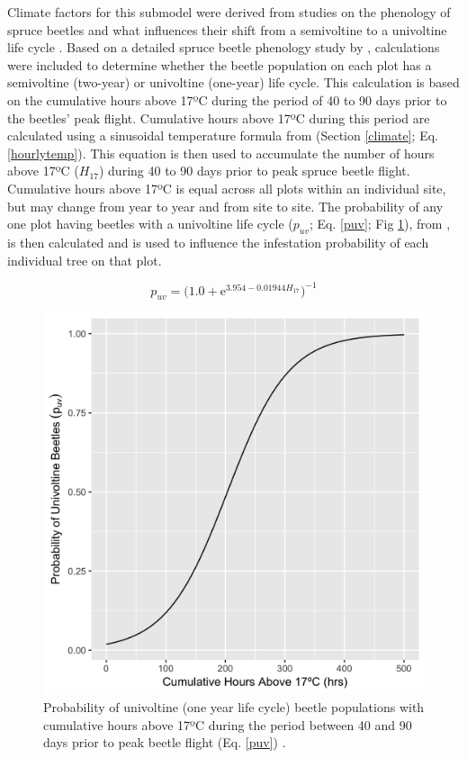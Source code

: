 \documentclass[a4paper, 12pt] {report}
\begin{document}
Climate factors for this submodel were derived from studies on the phenology of spruce beetles and what influences their shift from a semivoltine to a univoltine life cycle . Based on a detailed spruce beetle phenology study by , calculations were included to determine whether the beetle population on each plot has a semivoltine (two-year) or univoltine (one-year) life cycle. This calculation is based on the cumulative hours above 17ºC during the period of 40 to 90 days prior to the beetles’ peak flight. Cumulative hours above 17ºC during this period are calculated using a sinusoidal temperature formula from  (Section \ref{climate}; Eq. \ref{hourlytemp}). This equation is then used to accumulate the number of hours above 17ºC ($H_{17}$) during 40 to 90 days prior to peak spruce beetle flight. Cumulative hours above 17ºC is equal across all plots within an individual site, but may change from year to year and from site to site. The probability of any one plot having beetles with a univoltine life cycle ($p_{uv}$; Eq. \ref{puv}; Fig \ref{fig:fpuv}), from , is then calculated and is used to influence the infestation probability of each individual tree on that plot.

\begin{equation} \label{puv}
p_{uv} = \Big(1.0 + \text{e}^{3.954 - 0.01944H_{17}}\Big)^{-1}
\end{equation}

\begin{figure}
  \includegraphics[width=0.65\linewidth]{Figures/puv.png}
  \caption{Probability of univoltine (one year life cycle) beetle populations with cumulative hours above 17ºC during the period between 40 and 90 days prior to peak beetle flight (Eq. \ref{puv}) \protect\cite{hansenTemperaturebasedModelPredicting2001}.}
  \label{fig:fpuv}
\end{figure}
\end{document}
